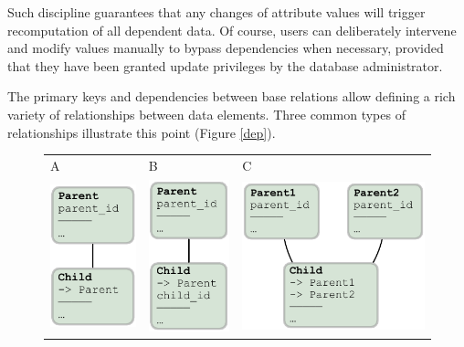 \documentclass[10pt,letterpaper]{article}
\begin{document}
Such discipline guarantees that any changes of attribute values will trigger recomputation of all dependent data. 
Of course, users can deliberately intervene and modify values manually to bypass dependencies when necessary, provided that they have been granted update privileges by the database administrator.

The primary keys and dependencies between base relations allow defining a rich variety of relationships between data elements.  
Three common types of relationships illustrate this point (Figure \ref{dep}). 

\begin{figure}[h]
\begin{center}
\begin{tabular}{p{}p{}p{}}
{\sf \large A} &
{\sf \large B} &
{\sf \large C} \\
\vspace{0pt} \includegraphics{./figures/depA.pdf} &
\vspace{0pt} \includegraphics{./figures/depB.pdf} &
\vspace{0pt} \includegraphics{./figures/depC.pdf}

\end{tabular}
\end{center}
\end{figure}
\end{document}
